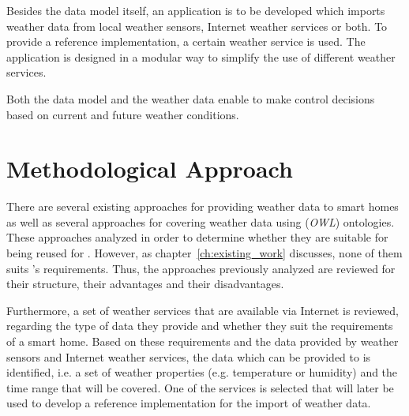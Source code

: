 Besides the data model itself, an application is to be developed which imports weather data from local weather sensors, Internet weather services or both. To provide a reference implementation, a certain weather service is used. The application is designed in a modular way to simplify the use of different weather services.

Both the data model and the weather data enable \thinkhome to make control decisions based on current and future weather conditions.

\section{Methodological Approach}




There are several existing approaches for providing weather data to smart homes as well as several approaches for covering weather data using (\emph{OWL}) ontologies. These approaches analyzed in order to determine whether they are suitable for being reused for \thinkhome. However, as chapter~\ref{ch:existing_work} discusses, none of them suits \thinkhome's requirements. Thus, the approaches previously analyzed are reviewed for their structure, their advantages and their disadvantages.

Furthermore, a set of weather services that are available via Internet is reviewed, regarding the type of data they provide and whether they suit the requirements of a smart home. Based on these requirements and the data provided by weather sensors and Internet weather services, the data which can be provided to \thinkhome is identified, i.e. a set of weather properties (e.g. temperature or humidity) and the time range that will be covered. One of the services is selected that will later be used to develop a reference implementation for the import of weather data.

